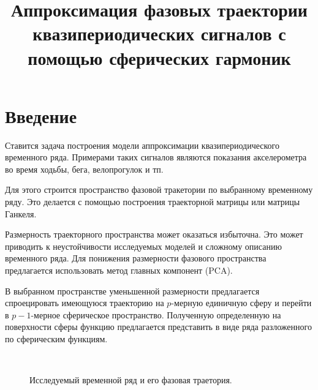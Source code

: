 \documentclass[12pt,twoside]{article}
\title
    [Аппроксимация фазовой траектории] 
    {Аппроксимация фазовых траектории квазипериодических сигналов с помощью сферических гармоник}
\author
    {Тихонов~Д.\,М., Стрижов~В.\,В.} %
\begin{document}
\newcommand{\nsymbol}[2]{\medskip\hangindent=\parindent\hangafter=1\noindent $#1$ --- #2\par}
\newcommand{\nsymbolp}[3]{\nsymbol{#1}{#2 \dotfill\pageref{#3}}}

\newcommand{\hookuparrow}{\mathrel{\rotatebox[origin=t]{270}{$\hookleftarrow$}}}
\newcommand{\hookdownarrow}{\mathrel{\rotatebox[origin=t]{90}{$\hookleftarrow$}}}

\maketitle

\section{Введение}
Ставится задача построения модели аппроксимации квазипериодического временного ряда.
Примерами таких сигналов являются показания акселерометра во время ходьбы, бега, велопрогулок и тп.
	
Для этого строится пространство фазовой тракетории по выбранному временному ряду.
Это делается с помощью построения траекторной матрицы или матрицы Ганкеля.

Размерность траекторного пространства может оказаться избыточна.
Это может приводить к неустойчивости исследуемых моделей и сложному описанию временного ряда.
Для понижения размерности фазового пространства предлагается использовать  метод главных компонент (PCA).
	
В выбранном пространстве уменьшенной размерности предлагается спроецировать имеющуюся траекторию на $p$-мерную единичную сферу и перейти в $p-1$-мерное сферическое пространство.
Полученную определенную на поверхности сферы функцию предлагается представить в виде ряда разложенного по сферическим функциям.

\begin{figure}[h]
\centering
  \\
\caption{Исследуемый временной ряд и его фазовая траетория. }
\label{fg:initial_traj}
\end{figure}
\end{document}
